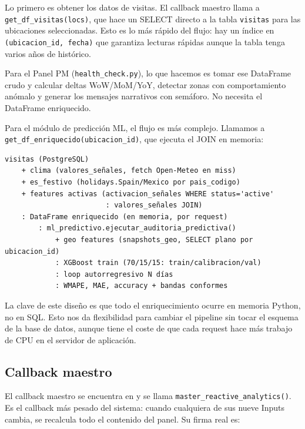 \documentclass[12pt, a4paper]{article}
\begin{document}
Lo primero es obtener los datos de visitas. El callback maestro llama a \texttt{get\_df\_visitas(locs)}, que hace un SELECT directo a la tabla \texttt{visitas} para las ubicaciones seleccionadas. Esto es lo más rápido del flujo: hay un índice en \texttt{(ubicacion\_id, fecha)} que garantiza lecturas rápidas aunque la tabla tenga varios años de histórico.

Para el Panel PM (\texttt{health\_check.py}), lo que hacemos es tomar ese DataFrame crudo y calcular deltas WoW/MoM/YoY, detectar zonas con comportamiento anómalo y generar los mensajes narrativos con semáforo. No necesita el DataFrame enriquecido.

Para el módulo de predicción ML, el flujo es más complejo. Llamamos a \texttt{get\_df\_enriquecido(ubicacion\_id)}, que ejecuta el JOIN en memoria:

\begin{verbatim}
visitas (PostgreSQL)
    + clima (valores_señales, fetch Open-Meteo en miss)
    + es_festivo (holidays.Spain/Mexico por pais_codigo)
    + features activas (activacion_señales WHERE status='active'
                        : valores_señales JOIN)
    : DataFrame enriquecido (en memoria, por request)
        : ml_predictivo.ejecutar_auditoria_predictiva()
            + geo features (snapshots_geo, SELECT plano por ubicacion_id)
            : XGBoost train (70/15/15: train/calibracion/val)
            : loop autorregresivo N días
            : WMAPE, MAE, accuracy + bandas conformes
\end{verbatim}

La clave de este diseño es que todo el enriquecimiento ocurre en memoria Python, no en SQL. Esto nos da flexibilidad para cambiar el pipeline sin tocar el esquema de la base de datos, aunque tiene el coste de que cada request hace más trabajo de CPU en el servidor de aplicación.

\subsection{Callback maestro}

El callback maestro se encuentra en  y se llama \texttt{master\_reactive\_analytics()}. Es el callback más pesado del sistema: cuando cualquiera de sus nueve Inputs cambia, se recalcula todo el contenido del panel. Su firma real es:
\end{document}
